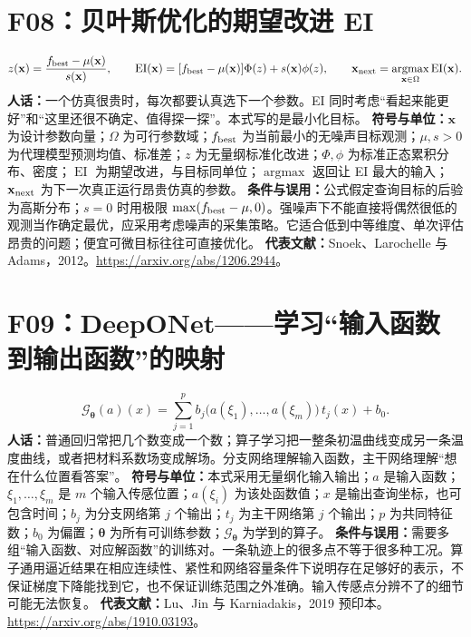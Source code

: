 \section{F08：贝叶斯优化的期望改进 EI}
\begin{equation}
 z(\mathbf x)=\frac{f_{\rm best}-\mu(\mathbf x)}{s(\mathbf x)},\qquad
 \operatorname{EI}(\mathbf x)=
 [f_{\rm best}-\mu(\mathbf x)]\Phi(z)+s(\mathbf x)\phi(z),\qquad
 \mathbf x_{\rm next}=\underset{\mathbf x\in\Omega}{\operatorname{argmax}}\operatorname{EI}(\mathbf x).
\end{equation}
\textbf{人话：}一个仿真很贵时，每次都要认真选下一个参数。EI 同时考虑“看起来能更好”和“这里还很不确定、值得探一探”。本式写的是最小化目标。
\textbf{符号与单位：}$\mathbf x$ 为设计参数向量；$\Omega$ 为可行参数域；$f_{\rm best}$ 为当前最小的无噪声目标观测；$\mu,s>0$ 为代理模型预测均值、标准差；$z$ 为无量纲标准化改进；$\Phi,\phi$ 为标准正态累积分布、密度；$\operatorname{EI}$ 为期望改进，与目标同单位；$\operatorname{argmax}$ 返回让 EI 最大的输入；$\mathbf x_{\rm next}$ 为下一次真正运行昂贵仿真的参数。
\textbf{条件与误用：}公式假定查询目标的后验为高斯分布；$s=0$ 时用极限 $\max(f_{\rm best}-\mu,0)$。强噪声下不能直接将偶然很低的观测当作确定最优，应采用考虑噪声的采集策略。它适合低到中等维度、单次评估昂贵的问题；便宜可微目标往往可直接优化。
\textbf{代表文献：}Snoek、Larochelle 与 Adams，2012。\url{https://arxiv.org/abs/1206.2944}。

\section{F09：DeepONet——学习“输入函数到输出函数”的映射}
\begin{equation}
 \mathcal G_{\boldsymbol\theta}(a)(x)
 =\sum_{j=1}^{p}b_j\bigl(a(\xi_1),\ldots,a(\xi_m)\bigr)\,t_j(x)+b_0.
\end{equation}
\textbf{人话：}普通回归常把几个数变成一个数；算子学习把一整条初温曲线变成另一条温度曲线，或者把材料系数场变成解场。分支网络理解输入函数，主干网络理解“想在什么位置看答案”。
\textbf{符号与单位：}本式采用无量纲化输入输出；$a$ 是输入函数；$\xi_1,\ldots,\xi_m$ 是 $m$ 个输入传感位置；$a(\xi_i)$ 为该处函数值；$x$ 是输出查询坐标，也可包含时间；$b_j$ 为分支网络第 $j$ 个输出；$t_j$ 为主干网络第 $j$ 个输出；$p$ 为共同特征数；$b_0$ 为偏置；$\boldsymbol\theta$ 为所有可训练参数；$\mathcal G_{\boldsymbol\theta}$ 为学到的算子。
\textbf{条件与误用：}需要多组“输入函数、对应解函数”的训练对。一条轨迹上的很多点不等于很多种工况。算子通用逼近结果在相应连续性、紧性和网络容量条件下说明存在足够好的表示，不保证梯度下降能找到它，也不保证训练范围之外准确。输入传感点分辨不了的细节可能无法恢复。
\textbf{代表文献：}Lu、Jin 与 Karniadakis，2019 预印本。\url{https://arxiv.org/abs/1910.03193}。

